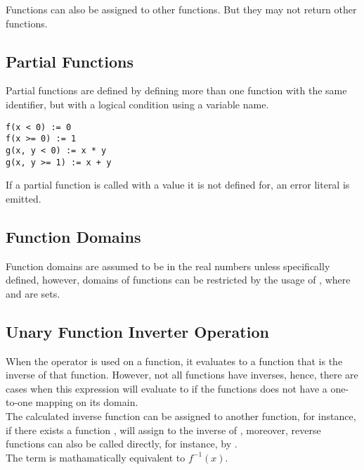 \documentclass[11pt,a4paper]{book}
\begin{document}
Functions can also be assigned to other functions. But they may not return other functions.
\subsection{Partial Functions}

Partial functions are defined by defining more than one function with the same identifier, but with a logical condition using a variable name.

\begin{lstlisting}
f(x < 0) := 0
f(x >= 0) := 1
g(x, y < 0) := x * y
g(x, y >= 1) := x + y 
\end{lstlisting}

If a partial function is called with a value it is not defined for, an  error literal is emitted.

\subsection{Function Domains}

Function domains are assumed to be in the real numbers unless specifically defined, however, domains of functions can be restricted by the usage of , where  and  are sets. \\

\subsection{Unary Function Inverter Operation \code{\textbackslash}}

When the operator \code{\textbackslash} is used on a function, it evaluates to a function that is the inverse of that function. However, not all functions have inverses, hence, there are cases when this expression will evaluate to  if the functions does not have a one-to-one mapping on its domain. \\

The calculated inverse function can be assigned to another function, for instance, if there exists a function ,  will assign  to the inverse of , moreover, reverse functions can also be called directly, for instance, by . \\

The term  is mathamatically equivalent to $f^{-1}(x)$.
\end{document}
